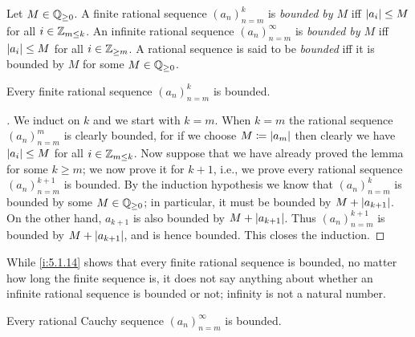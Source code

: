 \begin{defn}\label{i:5.1.12}
  Let \(M \in \mathbb{Q}_{\geq 0}\).
  A finite rational sequence \((a_n)_{n = m}^k\) is \emph{bounded by \(M\)} iff \(\left\lvert a_i\right\rvert \leq M\) for all \(i \in \mathbb{Z}_{m \leq k}\).
  An infinite rational sequence \((a_n)_{n = m}^{\infty}\) is \emph{bounded by \(M\)} iff \(\left\lvert a_i\right\rvert \leq M\) for all \(i \in \mathbb{Z}_{\geq m}\).
  A rational sequence is said to be \emph{bounded} iff it is bounded by \(M\) for some \(M \in \mathbb{Q}_{\geq 0}\).
\end{defn}

\setcounter{thm}{13}
\begin{lem}\label{i:5.1.14}
  Every finite rational sequence \((a_n)_{n = m}^k\) is bounded.
\end{lem}

\begin{proof}[]
  We induct on \(k\) and we start with \(k = m\).
  When \(k = m\) the rational sequence \((a_n)_{n = m}^m\) is clearly bounded, for if we choose \(M \coloneqq \left\lvert a_m\right\rvert\) then clearly we have \(\left\lvert a_i\right\rvert \leq M\) for all \(i \in \mathbb{Z}_{m \leq k}\).
  Now suppose that we have already proved the lemma for some \(k \geq m\);
  we now prove it for \(k + 1\), i.e., we prove every rational sequence \((a_n)_{n = m}^{k + 1}\) is bounded.
  By the induction hypothesis we know that \((a_n)_{n = m}^k\) is bounded by some \(M \in \mathbb{Q}_{\geq 0}\);
  in particular, it must be bounded by \(M + \left\lvert a_{k + 1}\right\rvert\).
  On the other hand, \(a_{k + 1}\) is also bounded by \(M + \left\lvert a_{k + 1}\right\rvert\).
  Thus \((a_n)_{n = m}^{k + 1}\) is bounded by \(M + \left\lvert a_{k + 1}\right\rvert\), and is hence bounded.
  This closes the induction.
\end{proof}

\begin{note}
  While \cref{i:5.1.14} shows that every finite rational sequence is bounded, no matter how long the finite sequence is, it does not say anything about whether an infinite rational sequence is bounded or not;
  infinity is not a natural number.
\end{note}

\begin{lem}\label{i:5.1.15}
  Every rational Cauchy sequence \((a_n)_{n = m}^{\infty}\) is bounded.
\end{lem}

